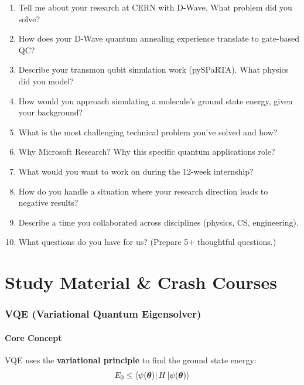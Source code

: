 \documentclass[11pt,a4paper]{article}
\begin{document}
\begin{questionbox}
\begin{enumerate}[label=\textbf{Q\arabic*.}, start=86]
    \item Tell me about your research at CERN with D-Wave. What problem did you solve?
    \item How does your D-Wave quantum annealing experience translate to gate-based QC?
    \item Describe your transmon qubit simulation work (pySPaRTA). What physics did you model?
    \item How would you approach simulating a molecule's ground state energy, given your background?
    \item What is the most challenging technical problem you've solved and how?
    \item Why Microsoft Research? Why this specific quantum applications role?
    \item What would you want to work on during the 12-week internship?
    \item How do you handle a situation where your research direction leads to negative results?
    \item Describe a time you collaborated across disciplines (physics, CS, engineering).
    \item What questions do you have for us? (Prepare 5+ thoughtful questions.)
\end{enumerate}
\end{questionbox}


\newpage
\part{Study Material \& Crash Courses}

\section{VQE (Variational Quantum Eigensolver)}

\subsection{Core Concept}

VQE uses the \textbf{variational principle} to find the ground state energy:
\begin{equation}
    E_0 \leq \bra{\psi(\boldsymbol{\theta})} H \ket{\psi(\boldsymbol{\theta})}
\end{equation}
\end{document}
